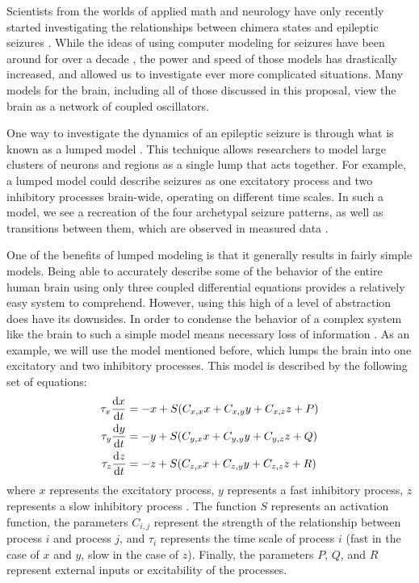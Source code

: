 Scientists from the worlds of applied math and neurology have only recently started investigating the relationships between chimera states and epileptic seizures \autocite{Santos2017,Andrzejak2016,Wang2012}.
While the ideas of using computer modeling for seizures have been around for over a decade \autocite{Lytton2008}, the power and speed of those models has drastically increased, and allowed us to investigate ever more complicated situations.
Many models for the brain, including all of those discussed in this proposal, view the brain as a network of coupled oscillators.

One way to investigate the dynamics of an epileptic seizure is through what is known as a lumped model \autocite{Baier2012}.
This technique allows researchers to model large clusters of neurons and regions as a single lump that acts together.
For example, a lumped model could describe seizures as one excitatory process and two inhibitory processes brain-wide, operating on different time scales.
In such a model, we see a recreation of the four archetypal seizure patterns, as well as transitions between them, which are observed in measured data \autocite{Wang2012}.

One of the benefits of lumped modeling is that it generally results in fairly simple models.
Being able to accurately describe some of the behavior of the entire human brain using only three coupled differential equations provides a relatively easy system to comprehend.
However, using this high of a level of abstraction does have its downsides.
In order to condense the behavior of a complex system like the brain to such a simple model means necessary loss of information \autocite{Lytton2008}.
As an example, we will use the model mentioned before, which lumps the brain into one excitatory and two inhibitory processes.
This model is described by the following set of equations:
\begin{align}
  \label{eq:x}
  \tau_{x}
  \dv{x}{t}
  &=
    -x
    +
    S(C_{x, x} x + C_{x, y} y + C_{x, z} z + P) \\
  \label{eq:y}
  \tau_{y}
  \dv{y}{t}
  &=
    -y
    +
    S(C_{y, x} x + C_{y, y} y + C_{y, z} z + Q) \\
  \label{eq:z}
  \tau_{z}
  \dv{z}{t}
  &=
    -z
    +
    S(C_{z, x} x + C_{z, y} y + C_{z, z} z + R)
\end{align}
where $x$ represents the excitatory process, $y$ represents a fast inhibitory process, $z$ represents a slow inhibitory process \autocite{Wang2012}.
The function $S$ represents an activation function, the parameters $C_{i, j}$ represent the strength of the relationship between process $i$ and process $j$, and $\tau_{i}$ represents the time scale of process $i$ (fast in the case of $x$ and $y$, slow in the case of $z$).
Finally, the parameters $P$, $Q$, and $R$ represent external inputs or excitability of the processes.

